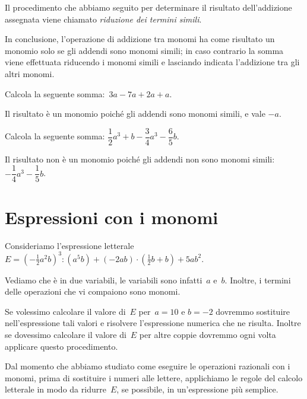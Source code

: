 Il procedimento che abbiamo seguito per determinare il risultato
dell'addizione assegnata viene chiamato
\emph{riduzione dei termini simili}.

In conclusione, l'operazione di addizione tra monomi ha
come risultato un monomio solo se gli addendi sono monomi simili; in
caso contrario la somma viene effettuata riducendo i monomi simili e
lasciando indicata l'addizione tra gli altri monomi.
\pagebreak
\begin{exrig}
 \begin{esempio}
Calcola la seguente somma:~$3a-7a+2a+a$.

Il risultato è un monomio poiché gli addendi sono monomi
simili, e vale $-a$.
 \end{esempio}

 \begin{esempio}
Calcola la seguente somma:
$\dfrac{1}{2}a^{3}+b-\dfrac{3}{4}a^{3}-\dfrac{6}{5}b$.

Il risultato non è un monomio poiché gli addendi non sono
monomi simili: $-{\dfrac{1}{4}}a^{3}-\dfrac{1}{5}b$.
 \end{esempio}
\end{exrig}

\ovalbox{\risolvii \ref{ese:10.25}, \ref{ese:10.26}, \ref{ese:10.27}, \ref{ese:10.28}, \ref{ese:10.29}, \ref{ese:10.30}, \ref{ese:10.31}}

\section{Espressioni con i monomi}
Consideriamo l'espressione letterale
$E=\left(-{\frac{1}{2}}a^{2}b\right)^{3}:(a^{5}b)+(-2ab)\cdot\left(\frac{1}{2}b+b\right)+5ab^{2}$.

Vediamo che è in due variabili, le variabili sono infatti~$a$ e~$b$. Inoltre, i termini delle operazioni che vi compaiono sono monomi.

Se volessimo calcolare il valore di~$E$ per~$a = 10$ e $b = -2$ dovremmo
sostituire nell'espressione tali valori e risolvere
l'espressione numerica che ne risulta. Inoltre se
dovessimo calcolare il valore di~$E$ per altre coppie dovremmo ogni volta
applicare questo procedimento.

Dal momento che abbiamo studiato come eseguire le operazioni razionali
con i monomi, prima di sostituire i numeri alle lettere, applichiamo le
regole del calcolo letterale in modo da ridurre~$E$, se possibile,
in un'espressione più semplice.

